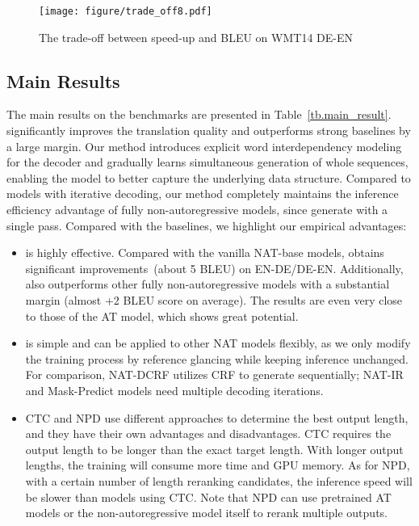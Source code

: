 \begin{figure}[!tbp]
\centering
\small
\centering
\texttt{[image: figure/trade\_off8.pdf]}
\caption{The trade-off between speed-up and BLEU on WMT14 DE-EN}
\label{fig.trade_off}
\end{figure}

\subsection{Main Results}
The main results on the benchmarks are presented in Table~\ref{tb.main_result}.
\method significantly improves the translation quality and outperforms strong baselines by a large margin.
Our method introduces explicit word interdependency modeling for the decoder and gradually learns simultaneous generation of whole sequences, enabling the model to better capture the underlying data structure. 
Compared to models with iterative decoding, our method completely maintains the inference efficiency advantage of fully non-autoregressive models, since \method generate with a single pass.
Compared with the baselines, we highlight our empirical advantages:
\begin{itemize}
    \item \method is highly effective. Compared with the vanilla NAT-base models, \method obtains significant improvements~(about 5 BLEU) on EN-DE/DE-EN. Additionally, \method also outperforms other fully non-autoregressive models with a substantial margin (almost +2 BLEU score on average). The results are even very close to those of the AT model, which shows great potential.
    
\item \method is simple and can be applied to other NAT models flexibly, as we only modify the training process by reference glancing while keeping inference unchanged. For comparison, NAT-DCRF utilizes CRF to generate sequentially; NAT-IR and Mask-Predict models need multiple decoding iterations.
    
    \item CTC and NPD use different approaches to determine the best output length, and they have their own advantages and disadvantages. CTC requires the output length to be longer than the exact target length. With longer output lengths, the training will consume more time and GPU memory. As for NPD, with a certain number of length reranking candidates, the inference speed will be slower than models using CTC. Note that NPD can use pretrained AT models or the non-autoregressive model itself to rerank multiple outputs.
\end{itemize}

